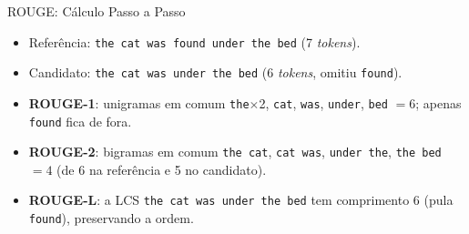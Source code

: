 \documentclass[aspectratio=169,xcolor=dvipsnames]{beamer}
\begin{document}
\begin{frame}{ROUGE: Cálculo Passo a Passo}
\begin{itemize}
    \item Referência: \texttt{the cat was \textcolor{red!70!black}{found} under the bed} \quad (7 \textit{tokens}).
    \item Candidato: \texttt{the cat was under the bed} \quad (6 \textit{tokens}, omitiu \texttt{\textcolor{red!70!black}{found}}).
\end{itemize}
\vspace{0.2em}
\centering
{}
\vspace{0.3em}
\begin{itemize}
    \item \textbf{ROUGE-1}: unigramas em comum \texttt{the}$\times$2, \texttt{cat}, \texttt{was}, \texttt{under}, \texttt{bed} $= 6$; apenas \texttt{found} fica de fora.
    \item \textbf{ROUGE-2}: bigramas em comum \texttt{the cat}, \texttt{cat was}, \texttt{under the}, \texttt{the bed} $= 4$ (de 6 na referência e 5 no candidato).
    \item \textbf{ROUGE-L}: a LCS \texttt{the cat was under the bed} tem comprimento $6$ (pula \texttt{found}), preservando a ordem.
\end{itemize}
\end{frame}
\end{document}
